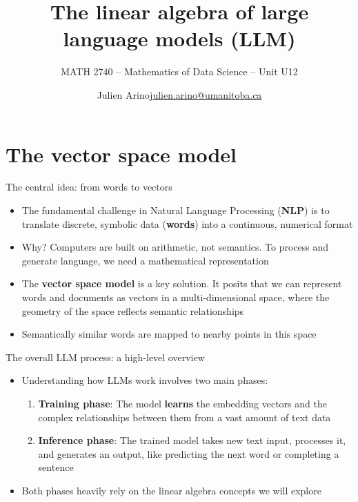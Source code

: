 \documentclass[aspectratio=169]{beamer}\usepackage[]{graphicx}\usepackage[]{xcolor}
\subtitle{MATH 2740 -- Mathematics of Data Science -- Unit U12}
\author{\texorpdfstring{Julien Arino\newline\url{julien.arino@umanitoba.ca}}{Julien Arino}}
\institute{Department of Mathematics @ University of Manitoba}
\title{The linear algebra of large language models (LLM)}
\makeatletter
\newcommand{\defword}[1]{\textbf{\textcolor{beamer@blendedblue}{#1}}}
\makeatother
\begin{document}
\SStitlepage
\SSoutlinepage

\section{The vector space model}

\begin{frame}{The central idea: from words to vectors}
\begin{itemize}
\item The fundamental challenge in Natural Language Processing (\defword{NLP}) is to translate discrete, symbolic data (\defword{words}) into a continuous, numerical format
\vfill
\item Why? Computers are built on arithmetic, not semantics. To process and generate language, we need a mathematical representation
\vfill
\item The \defword{vector space model} is a key solution. It posits that we can represent words and documents as vectors in a multi-dimensional space, where the geometry of the space reflects semantic relationships
\vfill
\item Semantically similar words are mapped to nearby points in this space
\end{itemize}
\end{frame}

\begin{frame}{The overall LLM process: a high-level overview}
\begin{itemize}
    \item Understanding how LLMs work involves two main phases:
    \vfill
    \begin{enumerate}
        \item \textbf{Training phase}: The model \textbf{learns} the embedding vectors and the complex relationships between them from a vast amount of text data
        \vfill
        \item \textbf{Inference phase}: The trained model takes new text input, processes it, and generates an output, like predicting the next word or completing a sentence
    \end{enumerate}
    \vfill
    \item Both phases heavily rely on the linear algebra concepts we will explore
\end{itemize}
\end{frame}
\end{document}
